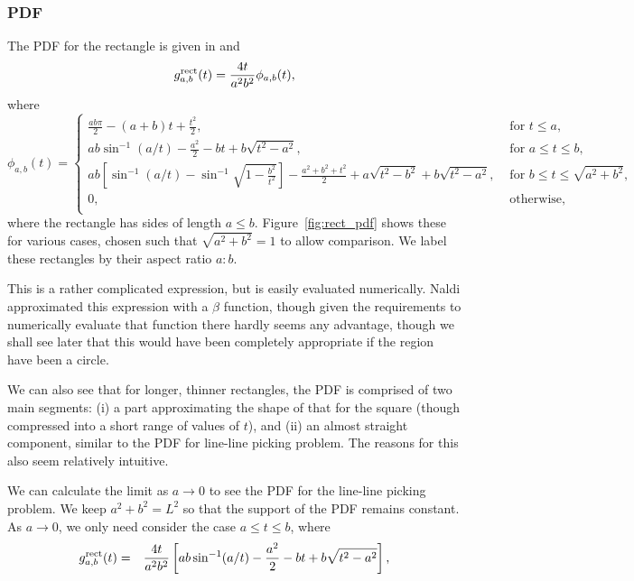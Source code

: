 \subsubsection{PDF}

The PDF for the rectangle is given in \cite[Theorem
2.4.4]{mathai_geom} and \cite[Theorem 2]{b.ghosh51:_random_rect}
\begin{equation}
  g^{\rm rect}_{a,b}(t) = \frac{4 t}{a^2 b^2} \phi_{a,b}(t),
  \label{eqn:rectangle}   
\end{equation}
where
\begin{equation}
  \phi_{a,b}(t) = \left\{
    \begin{array}{ll}
      \frac{ab \pi}{2} - (a+b) t + \frac{t^2}{2}, 
         & \mbox{ for } t \leq a, \\
      a b \sin^{-1} (a/t) - \frac{a^2}{2} - b t + b\sqrt{t^2 - a^2},
         & \mbox{ for } a \leq t \leq b, \\
      a b \left[ \sin^{-1} (a/t) - \sin^{-1} \sqrt{1 - \frac{b^2}{t^2}} \right]
        - \frac{a^2 + b^2 + t^2}{2} 
        + a\sqrt{t^2 - b^2}+ b\sqrt{t^2 - a^2},
         & \mbox{ for } b \leq t \leq \sqrt{a^2 + b^2}, \\
      0,
         & \mbox{ otherwise}, \\
    \end{array} \right. 
\end{equation}
where the rectangle has sides of length $a \leq
b$. Figure~\ref{fig:rect_pdf} shows these for various cases, chosen
such that $\sqrt{a^2 + b^2} = 1$ to allow comparison. We label these
rectangles by their aspect ratio $a: b$.

This is a rather complicated expression, but is easily evaluated
numerically.  Naldi \cite{m.naldi05:_connec_of_waxman_graph}
approximated this expression with a $\beta$ function, though given the
requirements to numerically evaluate that function there hardly seems
any advantage, though we shall see later that this would have been
completely appropriate if the region have been a circle.

We can also see that for longer, thinner rectangles, the PDF is
comprised of two main segments: (i) a part approximating the shape of
that for the square (though compressed into a short range of values of
$t$), and (ii) an almost straight component, similar to the PDF for
line-line picking problem. The reasons for this also seem relatively
intuitive. 

We can calculate the limit as $a \rightarrow 0$ to see the PDF for the
line-line picking problem.  We keep $a^2 + b^2 = L^2$ so that the
support of the PDF remains constant.  As $a \rightarrow 0$, we only
need consider the case $a \leq t \leq b$, where
\begin{eqnarray}
    g^{\rm rect}_{a,b}(t)
        & = & \frac{4 t}{a^2 b^2} 
                  \left[ a b \sin^{-1} (a/t) - \frac{a^2}{2} - b t + b\sqrt{t^2 - a^2} \right] , \nonumber \\
\end{eqnarray}

